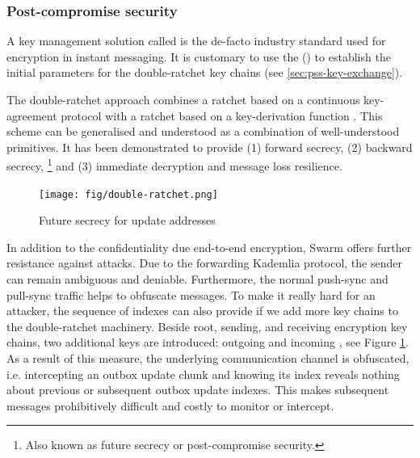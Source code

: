 \subsubsection{Post-compromise security}

A key management solution called  is the de-facto industry standard used for encryption in instant messaging.
It is customary to use the  () to establish the initial parameters for the double-ratchet key chains (see \ref{sec:pss-key-exchange}).

The double-ratchet approach combines a ratchet based on a continuous key-agreement protocol with a ratchet based on a key-derivation function \cite{perrin2016double}. This scheme can be generalised \cite{alwen2019double} and understood as a combination of well-understood primitives. It has been demonstrated to provide  (1) forward secrecy, (2) backward secrecy,%
%
\footnote{Also known as future secrecy or post-compromise security.}
%
and (3) immediate decryption and message loss resilience.


\begin{figure}[htbp]
\centering
\texttt{[image: fig/double-ratchet.png]}
\caption[Future secrecy for update addresses \statusorange]{Future secrecy for update addresses}
\label{fig:double-ratchet-for-feeds}
\end{figure}

In addition to the confidentiality due end-to-end encryption, Swarm offers further resistance against attacks. Due to the forwarding Kademlia protocol, the sender can remain ambiguous and deniable. Furthermore, the normal push-sync and pull-sync traffic helps to obfuscate messages. To make it really hard for an attacker, the sequence of indexes can also provide  if we add more key chains to the double-ratchet machinery. Beside root, sending, and receiving encryption key chains, two additional keys are introduced: outgoing and incoming , see Figure \ref{fig:double-ratchet-for-feeds}. As a result of this measure, the underlying communication channel is obfuscated, i.e. intercepting an outbox update chunk and knowing its index reveals nothing about previous or subsequent outbox update indexes. This makes subsequent messages prohibitively difficult and costly to monitor or intercept.


